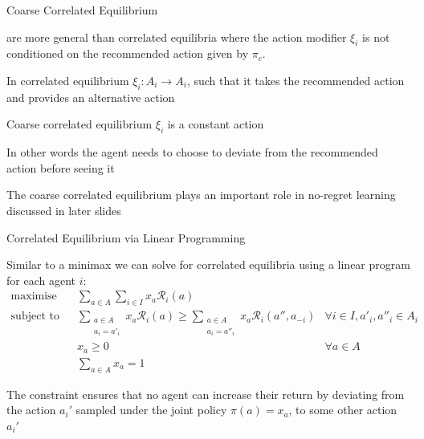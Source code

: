 \begin{frame}{Coarse Correlated Equilibrium}

 are more general than correlated equilibria where the action modifier \(\xi_i\) is not conditioned on the recommended action given by \(\pi_c\).

\blist
    \item In correlated equilibrium \(\xi_i: A_i \to A_i\), such that it takes the recommended action and provides an alternative action
    \item Coarse correlated equilibrium \(\xi_i\) is a constant action
    \item In other words the agent needs to choose to deviate from the recommended action before seeing it
    \item The coarse correlated equilibrium plays an important role in no-regret learning discussed in later slides
\elist
    
\end{frame}

\begin{frame}{Correlated Equilibrium via Linear Programming}

Similar to a minimax we can solve for correlated equilibria using a linear program for each agent \(i\):
\vspace{2pt}
\begin{align*}
\text{maximise} \quad & \sum_{a \in A} \sum_{i \in I} x_a \mathcal{R}_i(a) \\
\text{subject to} \quad & \sum_{\substack{a \in A \\ a_i=a'_i}} x_a \mathcal{R}_i(a) \geq \sum_{\substack{a \in A \\ a_i=a''_i}} x_a \mathcal{R}_i(a'', a_{-i}) & \forall i \in I, a'_i, a''_i \in A_i \\
& x_a \geq 0 & \forall a \in A \\
& \sum_{a \in A} x_a = 1
\end{align*}

\blist
    \item The constraint ensures that no agent can increase their return by deviating from the action \(a_{i}'\) sampled under the joint policy \(\pi(a) = x_a\), to some other action \(a_{i}'\)
\elist
\end{frame}

